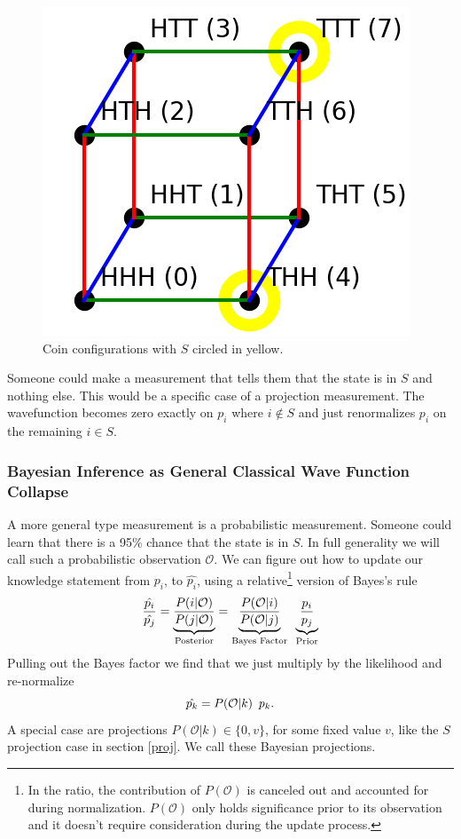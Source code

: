 \documentclass[12pt,a4paper]{article}
\begin{document}
\begin{figure}[h]
\centering
\includegraphics[scale=0.6]{cube.png}
\caption{Coin configurations with $S$ circled in yellow.}
\label{masslessshell}
\end{figure}

Someone could make a measurement that tells them that the state is in $S$ and nothing else.  This would be a specific case of a projection measurement.  The wavefunction becomes zero exactly on $p_i$ where $i \not \in S$ and just renormalizes $p_i$ on the remaining $i \in S$.

\subsubsection{Bayesian Inference as General Classical Wave Function Collapse}
A more general type measurement is a probabilistic measurement.  Someone could learn that there is a 95\% chance that the state is in $S$.  In full generality we will call such a probabilistic observation $\mathcal{O}$.  We can figure out how to update our knowledge statement from $p_i$, to $\hat{p_i}$, using a relative\footnote{In the ratio, the contribution of $P(\mathcal{O})$ is canceled out and accounted for during normalization.  $P(\mathcal{O})$ only holds significance prior to its observation and it doesn't require consideration during the update process.} version of Bayes's rule
\[
  \frac{\hat{p_i}}{\hat{p_j}} = \underbrace{\frac{P(i | \mathcal{O})}{P(j | \mathcal{O})}}_\text{Posterior}
                              = \underbrace{\frac{P(\mathcal{O} | i)}{P(\mathcal{O}|j)}}_\text{Bayes Factor}  \hspace{0.07 in}  \underbrace{\frac{p_i}{p_j}}_\text{Prior}
\]
Pulling out the Bayes factor we find that we just multiply by the likelihood and re-normalize
\[
  \hat{p_k} =  P(\mathcal{O} | k) \hspace{0.07 in} p_k.
\]
A special case are projections $P(\mathcal{O} | k) \in \{0,v\}$, for some fixed value $v$, like the $S$ projection case in section \ref{proj}.  We call these Bayesian projections.
\end{document}
